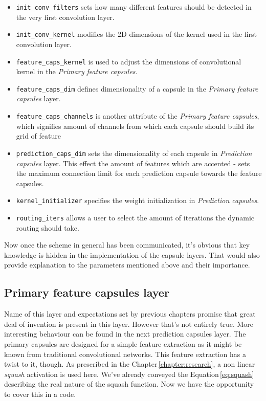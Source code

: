 \begin{itemize}
    \item \texttt{init\_conv\_filters} sets how many different features should be detected in the very first convolution layer.
    \item \texttt{init\_conv\_kernel} modifies the 2D dimensions of the kernel used in the first convolution layer.
    \item \texttt{feature\_caps\_kernel} is used to adjust the dimensions of convolutional kernel in the \textit{Primary feature capsules}.
    \item \texttt{feature\_caps\_dim} defines dimensionality of a capsule in the \textit{Primary feature capsules} layer.
    \item \texttt{feature\_caps\_channels} is another attribute of the \textit{Primary feature capsules}, which signifies amount of channels from which each capsule should build its grid of feature
    \item \texttt{prediction\_caps\_dim} sets the dimensionality of each capsule in \textit{Prediction capsules} layer. This effect the amount of features which are accented - sets the maximum connection limit for each prediction capsule towards the feature capsules.
    \item \texttt{kernel\_initializer} specifies the weight initialization in \textit{Prediction capsules}.
    \item \texttt{routing\_iters} allows a user to select the amount of iterations the dynamic routing should take.
\end{itemize}

Now once the scheme in general has been communicated, it's obvious that key knowledge is hidden in the implementation of the capsule layers. That would also provide explanation to the parameters mentioned above and their importance.

\subsection{Primary feature capsules layer}

Name of this layer and expectations set by previous chapters promise that great deal of invention is present in this layer. However that's not entirely true. More interesting behaviour can be found in the next prediction capsules layer. The primary capsules are designed for a simple feature extraction as it might be known from traditional convolutional networks. This feature extraction has a twist to it, though. As prescribed in the Chapter\,\ref{chapter:research}, a non linear \textit{squash} activation is used here. We've already conveyed the Equation\,\ref{eq:squash} describing the real nature of the squash function. Now we have the opportunity to cover this in a code.

